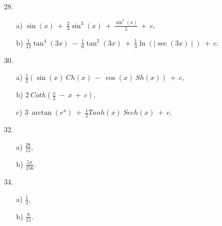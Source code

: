 \documentclass{article}
\begin{document}
\begin{enumerate}
    \item[28.]
    \begin{enumerate}
        \item[a)] $
        \sin(x)
        \ +\ 
        \frac
            {2}
            {3}
        \sin^3
            (x)
        \ +\ 
        \frac
            {\sin^5
                (x)
            }
            {5}
        \ +\ 
        c
        ,$
        \item[b)] $
        \frac
            {1}
            {12}
        \tan^4
            (3x)
        \ -\ 
        \frac
            {1}
            {6}
        \tan^2
            (3x)
        \ +\ 
        \frac
            {1}
            {3}
        \ln
            (\mid
                \sec
                    (3x)
            \mid)
        \ +\ 
        c
        $.
    \end{enumerate}
    \item[30.]
    \begin{enumerate}
        \item[a)] $
        \frac
            {1}
            {2}
        (
            \sin
                (x)
            \ 
            Ch
                (x)
            \ -\ 
            \cos
                (x)
            \ 
            Sh
                (x)
        )
        \ +\ 
        c
        ,$
        \item[b)] $
        2\ 
        Coth
            (
                \frac
                    {x}
                    {2}
                \ -\ 
                x
                \ +\ 
                c
            )
        ,$
        \item[c)] $
        3
        \ 
        \arctan
            (e^x)
        \ +\ 
        \frac
            {1}
            {2}
        Tanh
            (x)
        \ 
        Sech
            (x)
        \ +\ 
        c
        .$
    \end{enumerate}
    \item[32.]
    \begin{enumerate}
        \item[a)] $
        \frac
            {28}
            {15}
        ,$
        \item[b)] $
        \frac
            {5\pi}
            {256}
        .$
    \end{enumerate}
    \item[34.]
    \begin{enumerate}
        \item[a)] $
        \frac
            {1}
            {3}
        ,$
        \item[b)] $
        \frac
            {8}
            {15}
        .$
    \end{enumerate}
\end{enumerate}
\end{document}
